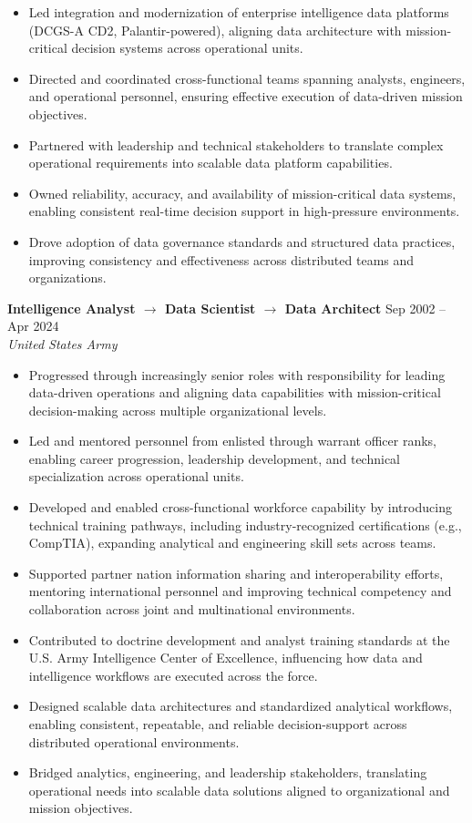 \begin{itemize}
    \item Led integration and modernization of enterprise intelligence data platforms (DCGS-A CD2, Palantir-powered), aligning data architecture with mission-critical decision systems across operational units.
    \item Directed and coordinated cross-functional teams spanning analysts, engineers, and operational personnel, ensuring effective execution of data-driven mission objectives.
    \item Partnered with leadership and technical stakeholders to translate complex operational requirements into scalable data platform capabilities.
    \item Owned reliability, accuracy, and availability of mission-critical data systems, enabling consistent real-time decision support in high-pressure environments.
    \item Drove adoption of data governance standards and structured data practices, improving consistency and effectiveness across distributed teams and organizations.
\end{itemize}

\vspace{4pt}

\textbf{Intelligence Analyst $\rightarrow$ Data Scientist $\rightarrow$ Data Architect} \hfill Sep 2002 -- Apr 2024\\
\textit{United States Army}

\begin{itemize}
    \item Progressed through increasingly senior roles with responsibility for leading data-driven operations and aligning data capabilities with mission-critical decision-making across multiple organizational levels.
    \item Led and mentored personnel from enlisted through warrant officer ranks, enabling career progression, leadership development, and technical specialization across operational units.
    \item Developed and enabled cross-functional workforce capability by introducing technical training pathways, including industry-recognized certifications (e.g., CompTIA), expanding analytical and engineering skill sets across teams.
    \item Supported partner nation information sharing and interoperability efforts, mentoring international personnel and improving technical competency and collaboration across joint and multinational environments.
    \item Contributed to doctrine development and analyst training standards at the U.S. Army Intelligence Center of Excellence, influencing how data and intelligence workflows are executed across the force.
    \item Designed scalable data architectures and standardized analytical workflows, enabling consistent, repeatable, and reliable decision-support across distributed operational environments.
    \item Bridged analytics, engineering, and leadership stakeholders, translating operational needs into scalable data solutions aligned to organizational and mission objectives.
\end{itemize}